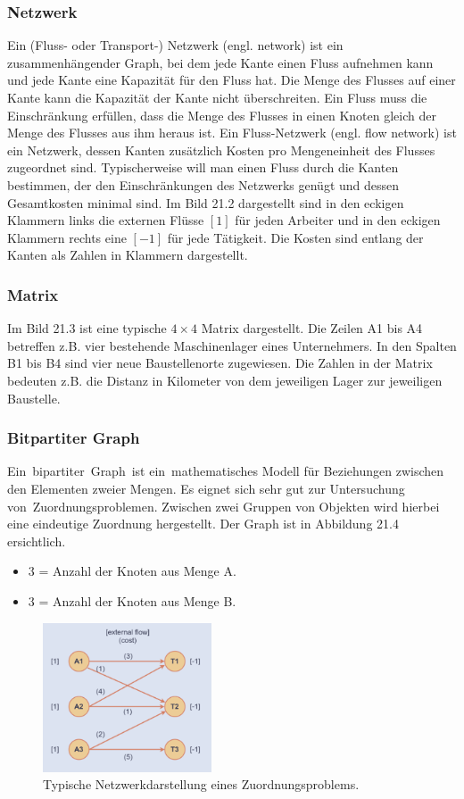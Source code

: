 \subsubsection{Netzwerk}
Ein (Fluss- oder Transport-) Netzwerk (engl. network) ist ein zusammenhängender Graph, bei dem jede Kante einen Fluss aufnehmen kann und jede Kante eine Kapazität für den Fluss hat. Die Menge des Flusses auf einer Kante kann die Kapazität der Kante nicht überschreiten. Ein Fluss muss die Einschränkung erfüllen, dass die Menge des Flusses in einen Knoten gleich der Menge des Flusses aus ihm heraus ist. Ein Fluss-Netzwerk (engl. flow network) ist ein Netzwerk, dessen Kanten zusätzlich Kosten pro Mengeneinheit des Flusses zugeordnet sind. Typischerweise will man einen Fluss durch die Kanten bestimmen, der den Einschränkungen des Netzwerks genügt und dessen Gesamtkosten minimal sind. Im Bild 21.2 dargestellt sind in den eckigen Klammern links die externen Flüsse $[1]$ für jeden Arbeiter und in den eckigen Klammern rechts eine $[-1]$ für jede Tätigkeit. Die Kosten sind entlang der Kanten als Zahlen in Klammern dargestellt.  
\subsubsection{Matrix}
Im Bild 21.3 ist eine typische $4\times 4$ Matrix dargestellt. Die Zeilen A1 bis A4 betreffen z.B. vier bestehende Maschinenlager eines Unternehmers. In den Spalten B1 bis B4 sind vier neue Baustellenorte zugewiesen. Die Zahlen in der Matrix bedeuten z.B. die Distanz in Kilometer von dem jeweiligen Lager zur jeweiligen Baustelle.
\subsubsection{Bitpartiter Graph}
Ein bipartiter Graph ist ein mathematisches Modell für Beziehungen
zwischen den Elementen zweier Mengen. Es eignet sich sehr gut zur Untersuchung von Zuordnungsproblemen. Zwischen zwei Gruppen von Objekten wird hierbei eine eindeutige Zuordnung hergestellt. Der Graph ist in Abbildung 21.4 ersichtlich.
\begin{itemize}
\item 3 = Anzahl der Knoten aus Menge A.
\item 3 = Anzahl der Knoten aus Menge B.
\end{itemize}


\begin{figure}
\centering
\includegraphics[width=5cm]{papers/munkres/figures/Netzwerkdarstellung}
\caption{Typische Netzwerkdarstellung eines Zuordnungsproblems.}
\label{munkres:Vr2}
\end{figure}

